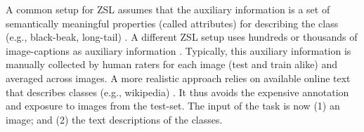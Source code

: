 \documentclass[11pt,a4paper]{article}
\newcommand\gal[1]{\textcolor{bright}{\textbf{GAL:} #1 }}
\newcommand\tzuf[1]{\textcolor{blue}{\textbf{TZUF:} #1 }}
\begin{document}
\vspace{-0.13in}



A common setup for ZSL assumes that the auxiliary information is a set of semantically meaningful properties (called attributes) for describing the class (e.g., black-beak, long-tail) \citep{wah2011caltech,farhadi2009describing}. A different ZSL setup  uses hundreds or thousands of image-captions as auxiliary information \citep{reed2016learning,Felix_2018_ECCV}. Typically, this auxiliary information is  manually collected by human raters for each image (test and train alike) and averaged across images.
A more realistic approach 
relies on available online text that describes classes (e.g., wikipedia) \cite{elhoseiny2017link}. It thus avoids the expensive annotation and exposure to images from the test-set. The input of the task is now (1) an image; and (2) the text descriptions of the classes. 

\end{document}
